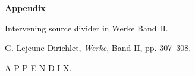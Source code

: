\documentclass[11pt]{article}
\begin{document}
\begin{center}
{\Large\bfseries Appendix\par}
\vspace{0.35em}
{\normalsize Intervening source divider in Werke Band II.\par}
\vspace{0.8em}
{\small G. Lejeune Dirichlet, \emph{Werke}, Band II, pp. 307--308.}
\end{center}


\thispagestyle{empty}
\vspace*{0.38\textheight}
\begin{center}
{\Huge A P P E N D I X.}
\end{center}
\end{document}
